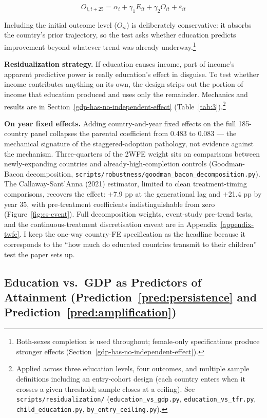 \documentclass[12pt,letterpaper]{article}
\begin{document}
\[O_{i,t+25} = \alpha_i + \gamma_1 E_{it} + \gamma_2 O_{it} + \varepsilon_{it}\]

Including the initial outcome level ($O_{it}$) is deliberately conservative: it absorbs the country's prior trajectory, so the test asks whether education predicts improvement beyond whatever trend was already underway.\footnote{Both-sexes completion is used throughout; female-only specifications produce stronger effects (Section~\ref{gdp-has-no-independent-effect}).}

\textbf{Residualization strategy.} If education causes income, part of
income's apparent predictive power is really education's effect in
disguise. To test whether income contributes anything on its own, the
design strips out the portion of income that education produced and
uses only the remainder. Mechanics and results are in
Section~\ref{gdp-has-no-independent-effect} (Table~\ref{tab:3}).\footnote{Applied across three education levels, four outcomes, and multiple sample definitions including an entry-cohort design (each country enters when it crosses a given threshold; sample closes at a ceiling). See \texttt{scripts/residualization/} (\texttt{education\_vs\_gdp.py}, \texttt{education\_vs\_tfr.py}, \texttt{child\_education.py}, \texttt{by\_entry\_ceiling.py}).}

\textbf{On year fixed effects.} Adding country-and-year fixed effects
on the full 185-country panel collapses the parental coefficient from
0.483 to 0.083 --- the mechanical signature of the staggered-adoption
pathology, not evidence against the mechanism. Three-quarters of the
2WFE weight sits on comparisons between newly-expanding countries and
already-high-completion controls (Goodman-Bacon decomposition,
\texttt{scripts/robustness/goodman\_bacon\_decomposition.py}). The
Callaway-Sant'Anna (2021) estimator, limited to clean treatment-timing
comparisons, recovers the effect: $+$7.9 pp at the generational lag
and $+$21.4 pp by year 35, with pre-treatment coefficients
indistinguishable from zero (Figure~\ref{fig:cs-event}). Full
decomposition weights, event-study pre-trend tests, and the
continuous-treatment discretisation caveat are in
Appendix~\ref{appendix-twfe}. I keep the one-way country-FE
specification as the headline because it corresponds to the ``how much
do educated countries transmit to their children'' test the paper sets
up.

\subsection{Education vs.\ GDP as Predictors of Attainment (Prediction~\ref{pred:persistence} and Prediction~\ref{pred:amplification})}\label{education-vs-gdp-as-predictors-of-attainment}
\end{document}
